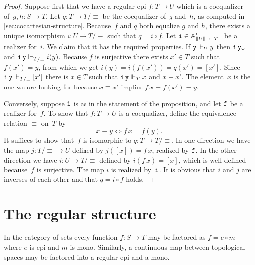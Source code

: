 \begin{proof}
  Suppose first that we have a regular epi $f : T \to U$
  which is a coequalizer of~$g, h : S \to T$. Let $q :
  T \to T/{\equiv}$ be the coequalizer of~$g$ and~$h$, as
  computed in \cref{sec:cocartesian-structure}. Because~$f$ and
  $q$ both equalize $g$ and $h$, there exists a unique isomorphism $i
  : U \to T/{\equiv}$ such that $q = i \circ f$. Let
  $\R{i} \in \subAtyp{\T{U} \to \T{T}}$ be a realizer for~$i$. We claim
  that it has the required properties. If $\R{y} \rz[U] y$ then
  $\defined{\R{i}\,\R{y}}$ and $\R{i}\,\R{y} \rz[T/{\equiv}] i(y)$.
  Because $f$ is surjective there exists $x' \in T$ such that $f(x') =
  y$, from which we get $i(y) = i(f(x')) = q(x') = [x']$. Since
  $\R{i}\,\R{y} \rz[T/{\equiv}] [x']$ there is $x \in T$ such that
  $\R{i}\,\R{y} \rz[T] x$ and $x \equiv x'$. The element~$x$ is the one
  we are looking for because $x \equiv x'$ implies $f\,x = f(x') = y$.

  Conversely, suppose $\R{i}$ is as in the statement of the
  proposition, and let $\R{f}$ be a realizer for~$f$. To show that $f
  : T \to U$ is a coequalizer, define the equivalence
  relation $\equiv$ on~$T$ by
  \begin{equation*}
    x \equiv y \iff f\,x = f(y).
  \end{equation*}
  It suffices to show that~$f$ is isomorphic to $q : T \to
  T/{\equiv}$. In one direction we have the map $j : T/{\equiv}
  \to U$ defined by $j([x]) = f\,x$, realized by $\R{f}$. In the other
  direction we have $i : U \to T/{\equiv}$ defined by $i(f\,x) = [x]$,
  which is well defined because~$f$ is surjective. The map $i$ is
  realized by~$\R{i}$. It is obvious that $i$ and $j$ are inverses of
  each other and that $q = i \circ f$ holds.
\end{proof}

\section{The regular structure}
\label{sec:regular-structure}

In the category of sets every function $f : S \to T$ may be factored
as $f = e \circ m$ where $e$ is epi and $m$ is mono. Similarly, a
continuous map between topological spaces may be factored into a
regular epi and a mono.


